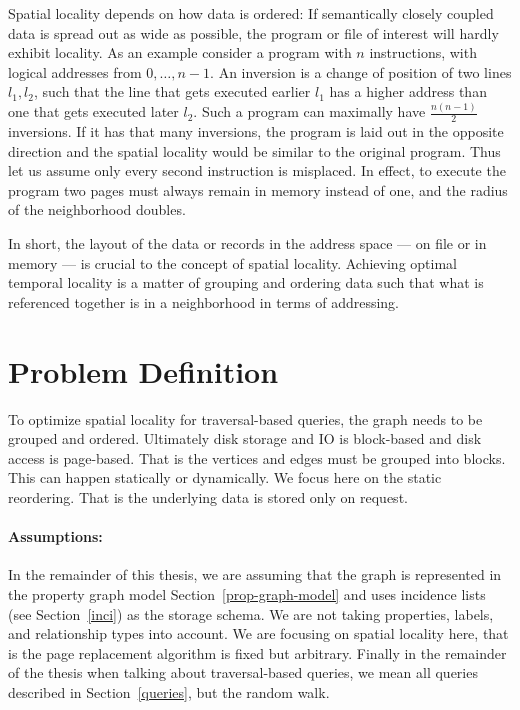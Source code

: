     Spatial locality depends on how data is ordered:
    If semantically closely coupled data is spread out as wide as possible, the program or file of interest will hardly exhibit locality. 
    As an example consider a program with $n$ instructions, with logical addresses from $0, \dots, n-1$. 
    An inversion is a change of position of two lines $l_1, l_2$, such that the line that gets executed earlier $l_1$ has a higher address than one that gets executed later $l_2$.
    Such a program can maximally have $\frac{n (n-1)}{2}$ inversions. 
    If it has that many inversions, the program is laid out in the opposite direction and the spatial locality would be similar to the original program.
    Thus let us assume only every second instruction is misplaced. 
    In effect, to execute the program two pages must always remain in memory instead of one, and the radius of the neighborhood doubles.
    
    In short, the layout of the data or records in the address space --- on file or in memory --- is crucial to the concept of spatial locality. 
    Achieving optimal temporal locality is a matter of grouping and ordering data such that what is referenced together is in a neighborhood in terms of addressing.
    
          
\section{Problem Definition}\label{prob-def}
    To optimize spatial locality for traversal-based queries, the graph needs to be grouped and ordered.
    Ultimately disk storage and IO is block-based and disk access is page-based. 
    That is the vertices and edges must be grouped into blocks.
    This can happen statically or dynamically. 
    We focus here on the static reordering.
    That is the underlying data is stored only on request.
    
    \paragraph{Assumptions:}
    In the remainder of this thesis, we are assuming that the graph is represented in the property graph model Section~\ref{prop-graph-model} and uses incidence lists (see Section~\ref{inci}) as the storage schema. 
    We are not taking properties, labels, and relationship types into account.
    We are focusing on spatial locality here, that is the page replacement algorithm is fixed but arbitrary.
    Finally in the remainder of the thesis when talking about traversal-based queries, we mean all queries described in Section~\ref{queries}, but the random walk.
    
